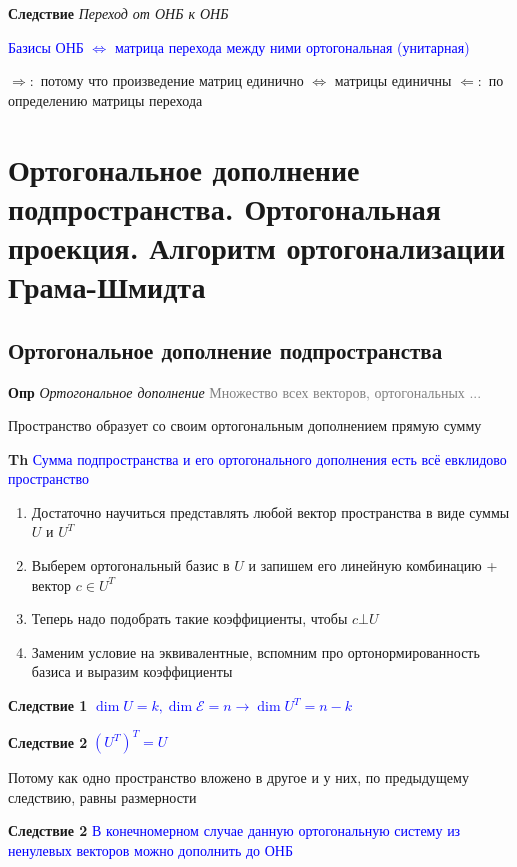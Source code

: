 \documentclass[a4paper, 14pt]{article}
\begin{document}
    \textbf{Следствие} \textit{Переход от ОНБ к ОНБ}
    
    \textcolor{blue}{Базисы ОНБ $\Leftrightarrow$ матрица перехода между ними ортогональная (унитарная)}
    
    $\Rightarrow:$ потому что произведение матриц единично $\Leftrightarrow$ матрицы единичны
    $\Leftarrow:$ по определению матрицы перехода
    
    \section{Ортогональное дополнение подпространства.
    Ортогональная проекция.
    Алгоритм ортогонализации Грама-Шмидта}
    
    \subsection{Ортогональное дополнение подпространства}
    
    \textbf{Опр} \textit{Ортогональное дополнение} \textcolor{gray}{Множество всех векторов, ортогональных ...}
    
    Пространство образует со своим ортогональным дополнением прямую сумму
    
    \textbf{Th} \textcolor{blue}{Сумма подпространства и его ортогонального дополнения есть всё евклидово пространство}
    
    \begin{enumerate}
        \item Достаточно научиться представлять любой вектор пространства в виде суммы $U$ и $U^T$
        \item Выберем ортогональный базис в $U$ и запишем его линейную комбинацию + вектор $c \in  U^T$
        \item Теперь надо подобрать такие коэффициенты, чтобы $c \bot U$
        \item Заменим условие на эквивалентные, вспомним про ортонормированность базиса и выразим коэффициенты
    \end{enumerate}
    
    \textbf{Следствие 1} \textcolor{blue}{$\dim U = k, \dim \mathscr{E} = n \rightarrow \dim U^T = n - k$}
    
    \textbf{Следствие 2} \textcolor{blue}{$(U^T)^T = U$}
    
    Потому как одно пространство вложено в другое и у них, по предыдущему следствию, равны размерности
    
    \textbf{Следствие 2} \textcolor{blue}{В конечномерном случае данную ортогональную систему из ненулевых векторов
    можно дополнить до ОНБ}
    
\end{document}
